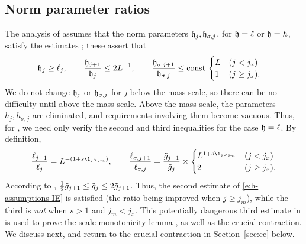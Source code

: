 
\subsection{Norm parameter ratios}
\label{sec:norm-parameter-ratios}

The analysis of \cite{BS-rg-IE} assumes that the norm parameters $\mathfrak{h}_j,\mathfrak{h}_{\sigma,j}$,
for $\mathfrak{h} = \ell$ or $\mathfrak{h} = h$,
satisfy the estimates \cite[\eqref{IE-e:h-assumptions}]{BS-rg-IE}; these assert that
\begin{align}
\label{e:h-assumptions-IE}
    \mathfrak{h}_j \ge \ell_{j},
    \quad\quad
    \frac{\mathfrak{h}_{j+1}}{\mathfrak{h}_j}
    &\le 2 L^{-1},
    \quad\quad
    \frac{\mathfrak{h}_{\sigma,j+1}}{\mathfrak{h}_{\sigma,j}}
    \le
    {\rm const}\,
    \begin{cases}
     L  & (j < j_{x})
     \\
     1 & (j \ge j_{x}).
     \end{cases}
\end{align}
We do not change $\mathfrak{h}_j$ or $\mathfrak{h}_{\sigma,j}$ for $j$ below the mass scale, so there
can be no difficulty until above the mass scale.  Above the mass scale, the parameters
$h_j,h_{\sigma,j}$ are eliminated, and requirements involving them become vacuous.
Thus, for , we need only verify the second and third
inequalities for the case $\mathfrak{h}=\ell$.
By definition,
\begin{equation}\label{e:h-assumptions}
\frac{\ell_{j+1}}{\ell_j} = L^{-(1 + s \1_{j \geq j_m})},
\qquad
\frac{\ell_{\sigma, j+1}}{\ell_{\sigma,j}} = \frac{\ggen_{j+1}}{\ggen_j}
\times
\begin{cases} L^{1 + s \1_{j \geq j_m}} & (j < j_x) \\ 2 & (j \geq j_x). \end{cases}
\end{equation}
According to \cite[\eqref{IE-e:gbarmono}]{BS-rg-IE},
$\frac 12 \tilde{g}_{j+1} \le \tilde{g}_j \le 2 \tilde{g}_{j+1}$.
Thus, the second estimate of \eqref{e:h-assumptions-IE}
is satisfied (the ratio being improved when $j\ge j_m$),
while the third is \emph{not} when $s > 1$ and $j_m < j_x$.
This potentially dangerous third
estimate in  is used to prove the scale monotonicity lemma
\cite[Lemma \ref{IE-lem:Imono}]{BS-rg-IE}, as well
as the crucial contraction.
We discuss
\cite[Lemma \ref{IE-lem:Imono}]{BS-rg-IE} next, and return to the crucial contraction
in Section~\ref{sec:cc} below.

